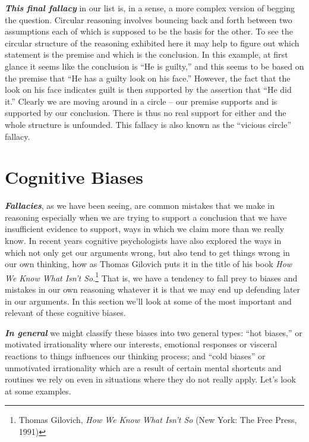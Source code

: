 \documentclass[12pt, openany]{book}
\begin{document}
\textbf{\emph{This final fallacy}} in our list is, in a sense, a more complex version of begging the question. Circular reasoning involves bouncing back and forth between two assumptions each of which is supposed to be the basis for the other. To see the circular structure of the reasoning exhibited here it may help to figure out which statement is the premise and which is the conclusion. In this example, at first glance it seems like the conclusion is ``He is guilty,'' and this seems to be based on the premise that ``He has a guilty look on his face.'' However, the fact that the look on his face indicates guilt is then supported by the assertion that ``He did it.'' Clearly we are moving around in a circle -- our premise supports and is supported by our conclusion. There is thus no real support for either and the whole structure is unfounded. This fallacy is also known as the ``vicious circle'' fallacy.

\hypertarget{cognitive-biases}{%
\section{Cognitive Biases}\label{cognitive-biases}}

\textbf{\emph{Fallacies}}, as we have been seeing, are common mistakes that we make in reasoning especially when we are trying to support a conclusion that we have insufficient evidence to support, ways in which we claim more than we really know. In recent years cognitive psychologists have also explored the ways in which not only get our arguments wrong, but also tend to get things wrong in our own thinking, how as Thomas Gilovich puts it in the title of his book \emph{How We Know What Isn't So}.\footnote{Thomas Gilovich, \emph{How We Know What Isn't So} (New York: The Free Press, 1991)} That is, we have a tendency to fall prey to biases and mistakes in our own reasoning whatever it is that we may end up defending later in our arguments. In this section we'll look at some of the most important and relevant of these cognitive biases.

\textbf{\emph{In general}} we might classify these biases into two general types: ``hot biases,'' or motivated irrationality where our interests, emotional responses or visceral reactions to things influences our thinking process; and ``cold biases'' or unmotivated irrationality which are a result of certain mental shortcuts and routines we rely on even in situations where they do not really apply. Let's look at some examples.
\end{document}
